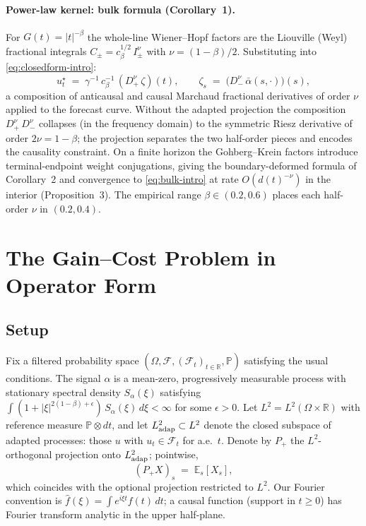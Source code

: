 \documentclass[11pt]{article}
\newcommand{\R}{\mathbb{R}}
\newcommand{\E}{\mathbb{E}}
\newcommand{\PP}{\mathbb{P}}
\newcommand{\F}{\mathcal{F}}
\newcommand{\adap}{{\rm adap}}
\theoremstyle{plain}
\begin{document}
\paragraph{Power-law kernel: bulk formula (Corollary~1).}
For $G(t) = |t|^{-\beta}$ the whole-line Wiener--Hopf factors are the Liouville (Weyl) fractional integrals $C_\pm = c_\beta^{1/2}\,I_\pm^\nu$ with $\nu = (1-\beta)/2$. Substituting into \eqref{eq:closedform-intro}:
\begin{equation}\label{eq:bulk-intro}
u^\star_t \;=\; \gamma^{-1}\,c_\beta^{-1}\,(D_+^\nu\,\zeta)(t), \qquad \zeta_s \;=\; \bigl(D_-^\nu\,\bar\alpha(s,\cdot)\bigr)(s),
\end{equation}
a composition of anticausal and causal Marchaud fractional derivatives of order $\nu$ applied to the forecast curve. Without the adapted projection the composition $D_+^\nu\,D_-^\nu$ collapses (in the frequency domain) to the symmetric Riesz derivative of order $2\nu = 1-\beta$; the projection separates the two half-order pieces and encodes the causality constraint. On a finite horizon the Gohberg--Krein factors introduce terminal-endpoint weight conjugations, giving the boundary-deformed formula of Corollary~2 and convergence to \eqref{eq:bulk-intro} at rate $O(d(t)^{-\nu})$ in the interior (Proposition~3). The empirical range $\beta\in(0.2,0.6)$ places each half-order $\nu$ in $(0.2,0.4)$.


\section{The Gain--Cost Problem in Operator Form}

\subsection{Setup}

Fix a filtered probability space $(\Omega, \F, (\F_t)_{t\in\R}, \PP)$ satisfying the usual conditions. The signal $\alpha$ is a mean-zero, progressively measurable process with stationary spectral density $S_\alpha(\xi)$ satisfying $\int(1+|\xi|^{2(1-\beta)+\epsilon})\,S_\alpha(\xi)\,d\xi<\infty$ for some $\epsilon>0$. Let $L^2 = L^2(\Omega\times\R)$ with reference measure $\PP\otimes dt$, and let $L^2_{\adap}\subset L^2$ denote the closed subspace of adapted processes: those $u$ with $u_t\in\F_t$ for a.e.\ $t$. Denote by $P_+$ the $L^2$-orthogonal projection onto $L^2_{\adap}$; pointwise,
\[
(P_+ X)_s \;=\; \E_s[X_s],
\]
which coincides with the optional projection restricted to $L^2$. Our Fourier convention is $\hat f(\xi) = \int e^{i\xi t}f(t)\,dt$; a causal function (support in $t\ge 0$) has Fourier transform analytic in the upper half-plane.
\end{document}
